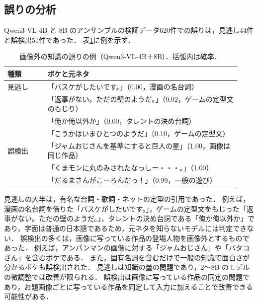 \subsection{誤りの分析}
Qwen3-VL-4B と 8B のアンサンブルの検証データ620件での誤りは，見逃し44件と誤検出51件であった．
表\ref{tab_errors}に例を示す．

\begin{table}[t]
    \centering
    \caption{画像外の知識の誤りの例（Qwen3-VL-4B＋8B）．括弧内は確率．}
    \label{tab_errors}
    \footnotesize
    \begin{tabular}{@{}p{0.16\linewidth}p{0.77\linewidth}@{}}
        \toprule
        種類 & ボケと元ネタ \\
        \midrule
        見逃し & 「バスケがしたいです。」（0.00，漫画の名台詞） \\
        & 「返事がない。ただの壁のようだ。」（0.02，ゲームの定型文のもじり） \\
        & 「俺か俺以外か」（0.00，タレントの決め台詞） \\
        & 「こうかはいまひとつのようだ」（0.10，ゲームの定型文） \\
        \midrule
        誤検出 & 「ジャムおじさんを基準にすると巨人の星」（1.00，画像は同じ作品） \\
        & 「くまモンに丸のみされたなっしー・・・。」（1.00） \\
        & 「だるまさんがこーろんだっ！」（0.99，一般の遊び） \\
        \bottomrule
    \end{tabular}
\end{table}

見逃しの大半は，有名な台詞・歌詞・ネットの定型の引用であった．
例えば，漫画の名台詞を借りた「バスケがしたいです。」，ゲームの定型文をもじった「返事がない。ただの壁のようだ。」，タレントの決め台詞である「俺か俺以外か」であり，字面は普通の日本語であるため，元ネタを知らないモデルには判定できない．
誤検出の多くは，画像に写っている作品の登場人物を画像外とするものであった．
例えば，アンパンマンの画像に対する「ジャムおじさん」や「バタコさん」を含むボケである．
また，固有名詞を含むだけで一般の知識で面白さが分かるボケも誤検出された．
見逃しは知識の量の問題であり，2〜8B のモデルの微調整では改善が限られる．
誤検出は画像に写っている作品の同定の問題であり，お題画像ごとに写っている作品を同定して入力に加えることで改善できる可能性がある．

